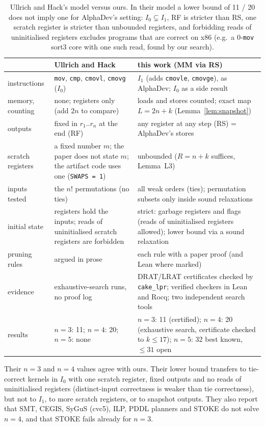 \begin{table}[h]\centering\small
\begin{tabular}{p{2.6cm}p{5.2cm}p{5.2cm}}\toprule
 & Ullrich and Hack~\cite{ullrich} & this work (MM via RS) \\\midrule
instructions & \texttt{mov}, \texttt{cmp}, \texttt{cmovl}, \texttt{cmovg} ($I_0$) & $I_1$ (adds \texttt{cmovle}, \texttt{cmovge}), as AlphaDev; $I_0$ as a side result \\
memory, counting & none; registers only (add $2n$ to compare) & loads and stores counted; exact map $L = 2n + k$ (Lemma~\ref{lem:snapshot}) \\
outputs & fixed in $r_1..r_n$ at the end (RF) & any register at any step (RS) = AlphaDev's stores \\
scratch registers & a fixed number $m$; the paper does not state $m$; the artifact code uses one (\texttt{SWAPS = 1}) & unbounded ($R = n + k$ suffices, Lemma~L3) \\
inputs tested & the $n!$ permutations (no ties) & all weak orders (ties); permutation subsets only inside sound relaxations \\
initial state & registers hold the inputs; reads of uninitialised scratch registers are forbidden & strict: garbage registers and flags (reads of uninitialised registers allowed); lower bound via a sound relaxation \\
pruning rules & argued in prose & each rule with a paper proof (and Lean where marked) \\
evidence & exhaustive-search runs, no proof log & DRAT/LRAT certificates checked by \texttt{cake\_lpr}; verified checkers in Lean and Rocq; two independent search tools \\
results & $n=3$: 11; $n=4$: 20; $n=5$: none & $n=3$: 11 (certified); $n=4$: 20 (exhaustive search, certificate checked to $k \le 17$); $n=5$: 32 best known, $\le 31$ open \\\bottomrule
\end{tabular}
\caption{Ullrich and Hack's model versus ours. In their model a lower bound of 11 / 20 does not imply one for AlphaDev's
setting: $I_0 \subsetneq I_1$, RF is stricter than RS, one scratch register is stricter than unbounded registers, and
forbidding reads of uninitialised registers excludes programs that are correct on x86 (e.g.\ a 0-\texttt{mov} sort3 core with one
such read, found by our search).}
\label{tab:uh}
\end{table}

\noindent Their $n = 3$ and $n = 4$ values agree with ours. Their lower bound transfers to tie-correct kernels in $I_0$ with one
scratch register, fixed outputs and no reads of uninitialised registers (distinct-input correctness is weaker than tie correctness), but not to $I_1$, to more
scratch registers, or to snapshot outputs. They also report that SMT, CEGIS, SyGuS (cvc5), ILP, PDDL planners and STOKE do not
solve $n = 4$, and that STOKE fails already for $n = 3$.


